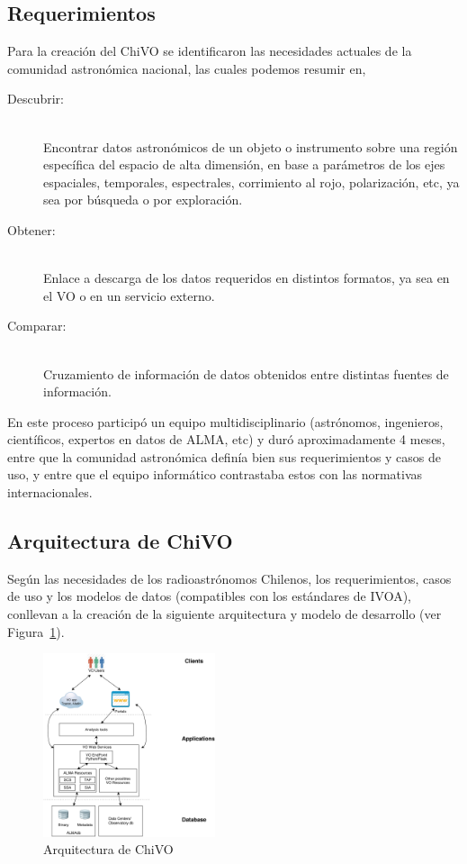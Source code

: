 \subsection{Requerimientos}

Para la creación del ChiVO se identificaron las necesidades actuales de la
comunidad astronómica nacional, las cuales podemos resumir en,

\begin{description}
    \item[Descubrir:] \hfill \\
        Encontrar datos astronómicos de un objeto o instrumento sobre una región
        específica del espacio de alta dimensión, en base a parámetros de los ejes
        espaciales, temporales, espectrales, corrimiento al rojo, polarización, etc,
        ya sea por búsqueda o por exploración.
    \item[Obtener:] \hfill \\
        Enlace a descarga de los datos requeridos en distintos formatos, ya sea en
        el VO o en un servicio externo.
    \item[Comparar:] \hfill \\
        Cruzamiento de información de datos obtenidos entre distintas fuentes de
        información.
\end{description}

En este proceso participó un equipo multidisciplinario (astrónomos, ingenieros,
científicos, expertos en datos de ALMA, etc) y duró aproximadamente 4 meses,
entre que la comunidad astronómica definía bien sus requerimientos y casos de
uso, y entre que el equipo informático contrastaba estos con las normativas
internacionales.


\subsection{Arquitectura de ChiVO}

Según las necesidades de los radioastrónomos Chilenos, los requerimientos,
casos de uso y los modelos de datos (compatibles con los estándares de IVOA),
conllevan a la creación de la siguiente arquitectura y modelo de desarrollo
(ver Figura~\ref{fig:chivoarch}).

\begin{figure}[ht]
    \centering
    \includegraphics[width=0.45\textwidth]{images/chivo_capas.png}
    \caption{Arquitectura de ChiVO}
    \label{fig:chivoarch}
\end{figure}

